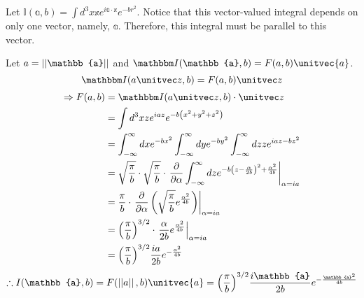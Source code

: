 \item

Let $\mathbb{I}(\mathbb{a}, b) = \int d^3x \mathbb{x} e^{i\mathbb{a} \cdot \mathbb{x}} e^{-br^2}$.
Notice that this vector-valued integral depends on only one vector, namely, $\mathbb{a}$.
Therefore, this integral must be parallel to this vector.

Let $a = \norm{\mathbb{a}}$ and $\mathbb{I}(\mathbb{a}, b) = F(a, b) \unitvec{a}$.
\[
	\mathbb{I}(a \zhat, b)
	= F(a, b) \zhat
\]
\begin{align*}
	\Rightarrow F(a, b)
	 & = \mathbb{I}(a \zhat, b) \cdot \zhat                                     \\
	 & = \int d^3 x z e^{iaz} e^{-b \left( x^2 + y^2 + z^2 \right)}             \\
	 & = \int_{-\infty}^{\infty} dx e^{-bx^2}
	\int_{-\infty}^{\infty} dy e^{-by^2}
	\int_{-\infty}^{\infty} dz z e^{iaz - bz^2}                                 \\
	 & = \sqrt{\frac{\pi}{b}} \cdot \sqrt{\frac{\pi}{b}} \cdot
	\evalAt{
	\partialderiv{\alpha} \int_{-\infty}^{\infty} dz e^{-b{\left( z - \frac{\alpha}{2b} \right)}^2 + \frac{\alpha^2}{4b}}
	}{\alpha = ia}                                                              \\
	 & = \frac{\pi}{b} \cdot \evalAt{
		\partialderiv{\alpha} \left(
		\sqrt{\frac{\pi}{b}} e^{\frac{\alpha^2}{4b}}
		\right)
	}{\alpha = ia}                                                              \\
	 & = {\left( \frac{\pi}{b} \right)}^{3/2} \cdot \evalAt{
		\frac{\alpha}{2b} e^{\frac{\alpha^2}{4b}}
	}{\alpha = ia}                                                              \\
	 & = {\left( \frac{\pi}{b} \right)}^{3/2} \frac{ia}{2b} e^{-\frac{a^2}{4b}}
\end{align*}
\[
	\therefore I(\mathbb{a}, b)
	= F(\norm{a}, b) \unitvec{a}
	= {\left( \frac{\pi}{b} \right)}^{3/2} \frac{i\mathbb{a}}{2b} e^{-\frac{\mathbb{a}^2}{4b}}
\]